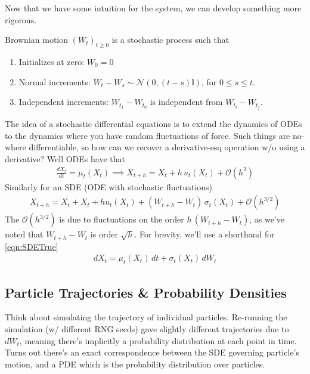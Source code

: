 Now that we have some intuition for the system, we can develop something more rigorous.
\begin{definition}
	 Brownian motion $(W_t)_{t\geq 0}$ is a stochastic process such that
	\begin{enumerate}
		\item Initializes at zero: $W_0 = 0$
		\item Normal increments: $W_t - W_s \sim \mathcal N(0,(t-s) \mathbb I)$, for $ 0 \leq s \leq t$.
		\item Independent increments: $W_{t_1} - W_{t_0}$ is independent from $W_{t_i} - W_{t_j}$.
	\end{enumerate}
\end{definition}
The idea of a stochastic differential equations is to extend the dynamics of ODEs to the dynamics where you have random fluctuations of force. Such things are no-where differentiable, so how can we recover a derivative-esq operation w/o using a derivative? Well ODEs  have that
\begin{align}
	\frac{dX_t}{dt} = \mu_t(X_t) \implies X_{t+h} = X_t + h\, u_t(X_t) + \mathcal O(h^2)
\end{align}
Similarly for an SDE (ODE with stochastic fluctuations)
\begin{align}
	X_{t+h} = X_t + X_t + h u_t(X_t)  + (W_{t+h} - W_t) \, \sigma_t(X_t) + \mathcal O(h^{3/2}) \label{eqn:SDETrue}
\end{align}
The $\mathcal O(h^{3/2})$ is due to fluctuations on the order $h \, (W_{t+h} - W_t)$, as we've noted that $W_{t+h} - W_t$ is order $\sqrt{h}$. For brevity, we'll use a shorthand for \ref{eqn:SDETrue}
\begin{align}
	dX_t = \mu_t(X_t) \, dt + \sigma_t(X_t)\, dW_t
\end{align}

\subsection{Particle Trajectories \& Probability Densities}
Think about simulating the trajectory of individual particles. Re-running the simulation (w/ different RNG seeds) gave slightly different trajectories due to $dW_t$, meaning there's implicitly a probability distribution at each point in time. Turns out there's an exact correspondence between the SDE governing particle's motion, and a PDE which is the probability distribution over particles.

